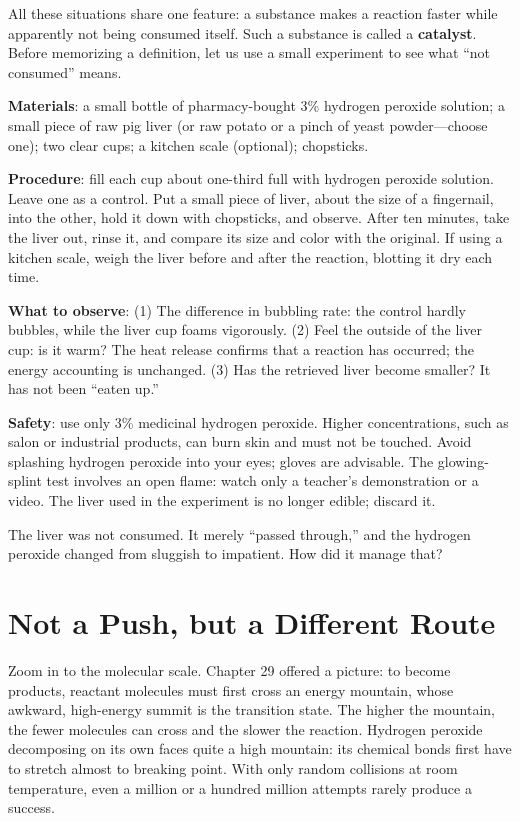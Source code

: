 All these situations share one feature: a substance makes a reaction faster while apparently not being consumed itself. Such a substance is called a \textbf{catalyst}. Before memorizing a definition, let us use a small experiment to see what ``not consumed'' means.

\begin{shiyan}
\textbf{Materials}: a small bottle of pharmacy-bought 3\% hydrogen peroxide solution; a small piece of raw pig liver (or raw potato or a pinch of yeast powder---choose one); two clear cups; a kitchen scale (optional); chopsticks.

\textbf{Procedure}: fill each cup about one-third full with hydrogen peroxide solution. Leave one as a control. Put a small piece of liver, about the size of a fingernail, into the other, hold it down with chopsticks, and observe. After ten minutes, take the liver out, rinse it, and compare its size and color with the original. If using a kitchen scale, weigh the liver before and after the reaction, blotting it dry each time.

\textbf{What to observe}: (1) The difference in bubbling rate: the control hardly bubbles, while the liver cup foams vigorously. (2) Feel the outside of the liver cup: is it warm? The heat release confirms that a reaction has occurred; the energy accounting is unchanged. (3) Has the retrieved liver become smaller? It has not been ``eaten up.''

\textbf{Safety}: use only 3\% medicinal hydrogen peroxide. Higher concentrations, such as salon or industrial products, can burn skin and must not be touched. Avoid splashing hydrogen peroxide into your eyes; gloves are advisable. The glowing-splint test involves an open flame: watch only a teacher's demonstration or a video. The liver used in the experiment is no longer edible; discard it.
\end{shiyan}

The liver was not consumed. It merely ``passed through,'' and the hydrogen peroxide changed from sluggish to impatient. How did it manage that?

\section{Not a Push, but a Different Route}

Zoom in to the molecular scale. Chapter 29 offered a picture: to become products, reactant molecules must first cross an energy mountain, whose awkward, high-energy summit is the transition state. The higher the mountain, the fewer molecules can cross and the slower the reaction. Hydrogen peroxide decomposing on its own faces quite a high mountain: its chemical bonds first have to stretch almost to breaking point. With only random collisions at room temperature, even a million or a hundred million attempts rarely produce a success.

